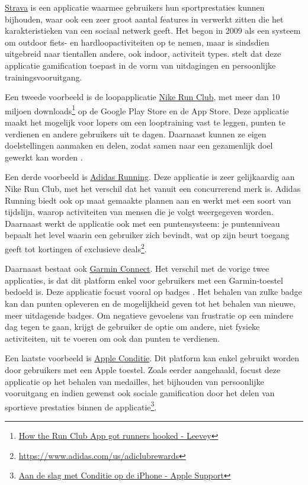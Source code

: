 \href{https://www.strava.com/}{Strava} is een applicatie waarmee gebruikers hun sportprestaties kunnen bijhouden, waar ook een zeer groot aantal features in verwerkt zitten die het karakteristieken van een sociaal netwerk geeft. Het begon in 2009 als een systeem om outdoor fiets- en hardloopactiviteiten op te nemen, maar is sindsdien uitgebreid naar tientallen andere, ook indoor, activiteit types. \textcite{Barratt2017} stelt dat deze applicatie gamification toepast in de vorm van uitdagingen en persoonlijke trainingsvooruitgang.

Een tweede voorbeeld is de loopapplicatie \href{https://www.nike.com/be/en/nrc-app}{Nike Run Club}, met meer dan 10 miljoen downloads\footnote{\href{https://bootcamp.uxdesign.cc/how-the-nike-run-club-app-got-runners-hooked-2850c7654fc5}{How the Run Club App got runners hooked - Leevey}} op de Google Play Store en de App Store. Deze applicatie maakt het mogelijk voor lopers om een looptraining vast te leggen, punten te verdienen en andere gebruikers uit te dagen. Daarnaast kunnen ze eigen doelstellingen aanmaken en delen, zodat samen naar een gezamenlijk doel gewerkt kan worden \autocite{StaalnackeLarsson2013}.

Een derde voorbeeld is \href{https://www.runtastic.com/}{Adidas Running}. Deze applicatie is zeer gelijkaardig aan Nike Run Club, met het verschil dat het vanuit een concurrerend merk is. Adidas Running biedt ook op maat gemaakte plannen aan en werkt met een soort van tijdslijn, waarop activiteiten van mensen die je volgt weergegeven worden. Daarnaast werkt de applicatie ook met een puntensysteem: je puntenniveau bepaalt het level waarin een gebruiker zich bevindt, wat op zijn beurt toegang geeft tot kortingen of exclusieve deals\footnote{\href{https://www.adidas.com/us/adiclubrewards}{https://www.adidas.com/us/adiclubrewards}}.

Daarnaast bestaat ook \href{https://connect.garmin.com/}{Garmin Connect}. Het verschil met de vorige twee applicaties, is dat dit platform enkel voor gebruikers met een Garmin-toestel bedoeld is. Deze applicatie focust vooral op badges \autocite{Ilhan2019}. Het behalen van zulke badge kan dan punten opleveren en de mogelijkheid geven tot het behalen van nieuwe, meer uitdagende badges. Om negatieve gevoelens van frustratie op een mindere dag tegen te gaan, krijgt de gebruiker de optie om andere, niet fysieke activiteiten, uit te voeren om ook dan punten te verdienen.

Een laatste voorbeeld is \href{https://support.apple.com/nl-be/guide/iphone/ipha5dddb411/ios}{Apple Conditie}. Dit platform kan enkel gebruikt worden door gebruikers met een Apple toestel. Zoals eerder aangehaald, focust deze applicatie op het behalen van medailles, het bijhouden van persoonlijke vooruitgang en indien gewenst ook sociale gamification door het delen van sportieve prestaties binnen de applicatie\footnote{\href{https://support.apple.com/nl-be/guide/iphone/ipha5dddb411/ios}{Aan de slag met Conditie op de iPhone - Apple Support}}.


